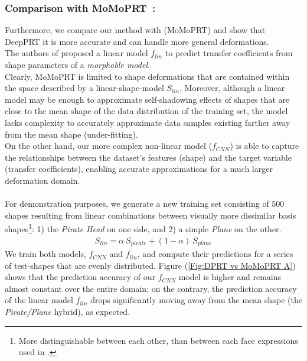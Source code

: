 \subsubsection*{\textbf{Comparison with MoMoPRT}~:}
Furthermore, we compare our method with \cite{MoMoPRT} (MoMoPRT) and show that DeepPRT it is more accurate and can handle more general deformations. \\
The authors of \cite{MoMoPRT} proposed a linear model $f_{lin}$ to predict transfer coefficients from shape parameters of a \textit{morphable model}.
\\
Clearly, MoMoPRT is limited to shape deformations that are contained within the space described by a linear-shape-model $S_{lin}$. Moreover, although a linear model may be enough to approximate self-shadowing effects of shapes that are close to the mean shape of the data distribution of the training set, the model lacks complexity to accurately approximate data samples existing farther away from the mean shape (under-fitting).  
\\
On the other hand, our more complex non-linear model ($f_{CNN}$) is able to capture the relationships between the dataset's features (shape) and the target variable (transfer coefficients), enabling accurate approximations for a much larger deformation domain.\\
\\
For demonstration purposes, we generate a new training set consisting of $500$ shapes resulting from linear combinations between visually more dissimilar basis shapes\footnote{More distinguishable between each other, than between each face expressions used in \cite{MoMo}.}: 1) the \textit{Pirate Head } on one side, and 2)  a simple \textit{Plane} on the other. 
\begin{align*}
S_{lin} = \alpha ~ S_{pirate} + (1 - \alpha)~S_{plane}
\end{align*}
We train both models, $f_{CNN}$ and $f_{lin}$, and compute their predictions for a series of test-shapes that are evenly distributed. Figure (\ref{Fig:DPRT vs MoMoPRT A}) shows that the prediction accuracy of our $f_{CNN}$ model is higher and remains almost constant over the entire domain; on the contrary, the prediction accuracy of the linear model $f_{lin}$ drops significantly moving away from the mean shape (the \textit{Pirate/Plane} hybrid), as expected. 

